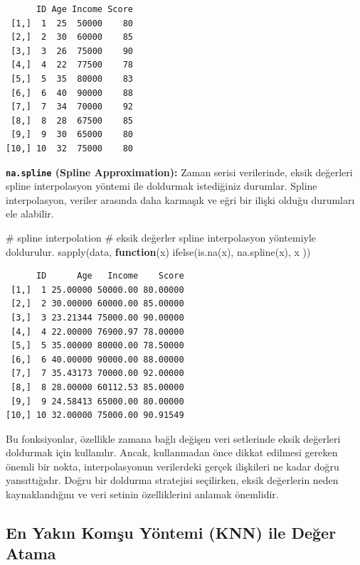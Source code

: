 \documentclass[
  letterpaper,
  DIV=11,
  numbers=noendperiod]{scrreprt}
\newenvironment{Shaded}{\begin{snugshade}}{\end{snugshade}}
\newcommand{\CommentTok}[1]{\textcolor[rgb]{0.37,0.37,0.37}{#1}}
\newcommand{\ControlFlowTok}[1]{\textcolor[rgb]{0.00,0.23,0.31}{\textbf{#1}}}
\newcommand{\FunctionTok}[1]{\textcolor[rgb]{0.28,0.35,0.67}{#1}}
\newcommand{\NormalTok}[1]{\textcolor[rgb]{0.00,0.23,0.31}{#1}}
\begin{document}
\begin{verbatim}
      ID Age Income Score
 [1,]  1  25  50000    80
 [2,]  2  30  60000    85
 [3,]  3  26  75000    90
 [4,]  4  22  77500    78
 [5,]  5  35  80000    83
 [6,]  6  40  90000    88
 [7,]  7  34  70000    92
 [8,]  8  28  67500    85
 [9,]  9  30  65000    80
[10,] 10  32  75000    80
\end{verbatim}

\textbf{\texttt{na.spline} (Spline Approximation):} Zaman serisi
verilerinde, eksik değerleri spline interpolasyon yöntemi ile doldurmak
istediğiniz durumlar. Spline interpolasyon, veriler arasında daha
karmaşık ve eğri bir ilişki olduğu durumları ele alabilir.

\begin{Shaded}
\begin{Highlighting}[]
\CommentTok{\# spline interpolation}
\CommentTok{\# eksik değerler spline interpolasyon yöntemiyle doldurulur.}
\FunctionTok{sapply}\NormalTok{(data, }\ControlFlowTok{function}\NormalTok{(x) }\FunctionTok{ifelse}\NormalTok{(}\FunctionTok{is.na}\NormalTok{(x), }\FunctionTok{na.spline}\NormalTok{(x), x ))}
\end{Highlighting}
\end{Shaded}

\begin{verbatim}
      ID      Age   Income    Score
 [1,]  1 25.00000 50000.00 80.00000
 [2,]  2 30.00000 60000.00 85.00000
 [3,]  3 23.21344 75000.00 90.00000
 [4,]  4 22.00000 76900.97 78.00000
 [5,]  5 35.00000 80000.00 78.50000
 [6,]  6 40.00000 90000.00 88.00000
 [7,]  7 35.43173 70000.00 92.00000
 [8,]  8 28.00000 60112.53 85.00000
 [9,]  9 24.58413 65000.00 80.00000
[10,] 10 32.00000 75000.00 90.91549
\end{verbatim}

Bu fonksiyonlar, özellikle zamana bağlı değişen veri setlerinde eksik
değerleri doldurmak için kullanılır. Ancak, kullanmadan önce dikkat
edilmesi gereken önemli bir nokta, interpolasyonun verilerdeki gerçek
ilişkileri ne kadar doğru yansıttığıdır. Doğru bir doldurma stratejisi
seçilirken, eksik değerlerin neden kaynaklandığını ve veri setinin
özelliklerini anlamak önemlidir.

\subsection*{En Yakın Komşu Yöntemi (KNN) ile Değer
Atama}\label{en-yakux131n-komux15fu-yuxf6ntemi-knn-ile-deux11fer-atama}
\end{document}

